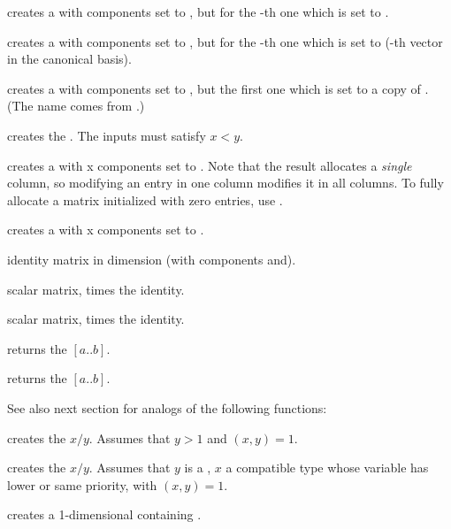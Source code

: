  creates a  with 
components set to , but for the -th one which is set to
.

 creates a  with 
components set to , but for the -th one which is set to
 (-th vector in the canonical basis).

 creates a  with 
components set to , but the first one which is set to a copy
of . (The name comes from .)

\smallskip

 creates the  .
The inputs must satisfy $x < y$.

 creates a  with  x 
components set to . Note that the result allocates a
\emph{single} column, so modifying an entry in one column modifies it in
all columns. To fully allocate a matrix initialized with zero entries,
use .

 creates a  with  x
 components set to .

 identity matrix in dimension  (with
components  and).

 scalar matrix,  times the identity.

 scalar matrix,  times
the identity.

 returns the  $[a..b]$.

 returns the  $[a..b]$.

\smallskip
See also next section for analogs of the following functions:

 creates the  $x/y$. Assumes that
$y > 1$ and $(x,y) = 1$.

 creates the  $x/y$.
Assumes that $y$ is a , $x$ a compatible type whose variable has
lower or same priority, with $(x,y) = 1$.

 creates a 1-dimensional  containing
.

